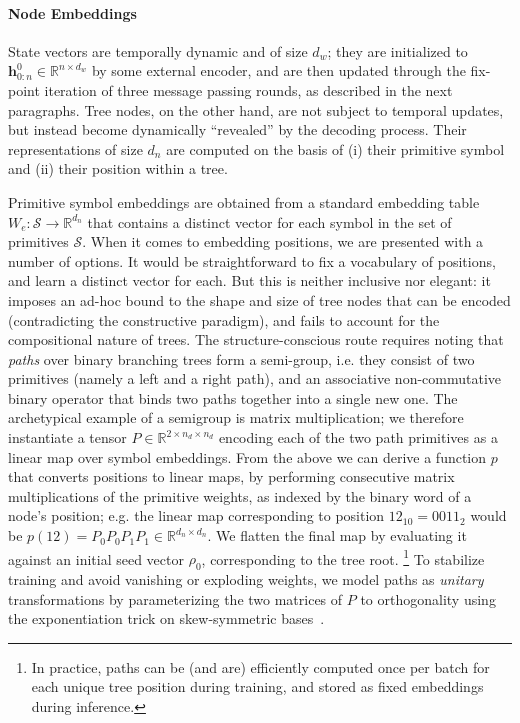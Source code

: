 \paragraph{Node Embeddings}
State vectors are temporally dynamic and of size $d_w$; they are initialized to $\mathbf{h}_{0:n}^0 \in \mathbb{R}^{n\times d_w}$ by some external encoder, and are then updated through the fix-point iteration of three message passing rounds, as described in the next paragraphs.
Tree nodes, on the other hand, are not subject to temporal updates, but instead become dynamically ``revealed'' by the decoding process. 
Their representations of size $d_n$ are computed on the basis of (i) their primitive symbol and (ii) their position within a tree.

Primitive symbol embeddings are obtained from a standard embedding table $W_e: \mathcal{S} \to \mathbb{R}^{d_n}$ that contains a distinct vector for each symbol in the set of primitives $\mathcal{S}$. 
When it comes to embedding positions, we are presented with a number of options.
It would be straightforward to fix a vocabulary of positions, and learn a distinct vector for each.
But this is neither inclusive nor elegant: it imposes an ad-hoc bound to the shape and size of tree nodes that can be encoded (contradicting the constructive paradigm), and fails to account for the compositional nature of trees.
The structure-conscious route requires noting that \textit{paths} over binary branching trees form a semi-group, i.e. they consist of two primitives (namely a left and a right path), and an associative non-commutative binary operator that binds two paths together into a single new one.
The archetypical example of a semigroup is matrix multiplication; we therefore instantiate a tensor $P \in \mathbb{R}^{2 \times n_d \times n_d}$ encoding each of the two path primitives as a linear map over symbol embeddings.
From the above we can derive a function $p$ that converts positions to linear maps, by performing consecutive matrix multiplications of the primitive weights, as indexed by the binary word of a node's position; e.g. the linear map corresponding to position $12_{10} = 0011_{2}$ would be $p(12) = P_0P_0P_1P_1 \in \mathbb{R}^{d_n \times d_n}$.
We flatten the final map by evaluating it against an initial seed vector $\rho_0$, corresponding to the tree root.%
	\footnote{In practice, paths can be (and are) efficiently computed once per batch for each unique tree position during training, and stored as fixed embeddings during inference.}
To stabilize training and avoid vanishing or exploding weights, we model paths as \textit{unitary} transformations by parameterizing the two matrices of $P$ to orthogonality using the exponentiation trick on skew-symmetric bases~\cite{bader2019computing,lezcano2019trivializations}.
